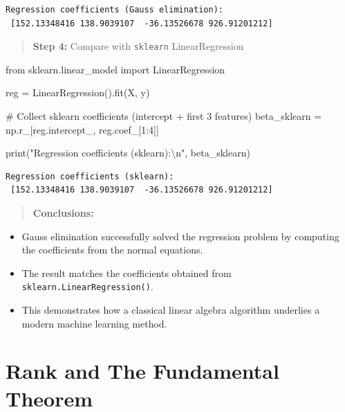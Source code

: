 \documentclass[
  letterpaper,
  DIV=11,
  numbers=noendperiod]{scrreprt}
\newenvironment{Shaded}{\begin{snugshade}}{\end{snugshade}}
\newcommand{\BuiltInTok}[1]{\textcolor[rgb]{0.00,0.23,0.31}{#1}}
\newcommand{\CharTok}[1]{\textcolor[rgb]{0.13,0.47,0.30}{#1}}
\newcommand{\CommentTok}[1]{\textcolor[rgb]{0.37,0.37,0.37}{#1}}
\newcommand{\DecValTok}[1]{\textcolor[rgb]{0.68,0.00,0.00}{#1}}
\newcommand{\ImportTok}[1]{\textcolor[rgb]{0.00,0.46,0.62}{#1}}
\newcommand{\NormalTok}[1]{\textcolor[rgb]{0.00,0.23,0.31}{#1}}
\newcommand{\OperatorTok}[1]{\textcolor[rgb]{0.37,0.37,0.37}{#1}}
\newcommand{\StringTok}[1]{\textcolor[rgb]{0.13,0.47,0.30}{#1}}
\begin{document}
\begin{verbatim}
Regression coefficients (Gauss elimination):
 [152.13348416 138.9039107  -36.13526678 926.91201212]
\end{verbatim}

\begin{quote}
\textbf{Step 4:} Compare with \texttt{sklearn} LinearRegression
\end{quote}

\begin{Shaded}
\begin{Highlighting}[]
\ImportTok{from}\NormalTok{ sklearn.linear\_model }\ImportTok{import}\NormalTok{ LinearRegression}

\NormalTok{reg }\OperatorTok{=}\NormalTok{ LinearRegression().fit(X, y)}

\CommentTok{\# Collect sklearn coefficients (intercept + first 3 features)}
\NormalTok{beta\_sklearn }\OperatorTok{=}\NormalTok{ np.r\_[reg.intercept\_, reg.coef\_[}\DecValTok{1}\NormalTok{:}\DecValTok{4}\NormalTok{]]}

\BuiltInTok{print}\NormalTok{(}\StringTok{"Regression coefficients (sklearn):}\CharTok{\textbackslash{}n}\StringTok{"}\NormalTok{, beta\_sklearn)}
\end{Highlighting}
\end{Shaded}

\begin{verbatim}
Regression coefficients (sklearn):
 [152.13348416 138.9039107  -36.13526678 926.91201212]
\end{verbatim}

\begin{quote}
\textbf{Conclusions:}
\end{quote}

\begin{itemize}
\item
  Gauss elimination successfully solved the regression problem by
  computing the coefficients from the normal equations.
\item
  The result matches the coefficients obtained from
  \texttt{sklearn.LinearRegression()}.
\item
  This demonstrates how a classical linear algebra algorithm underlies a
  modern machine learning method.
\end{itemize}

\section{Rank and The Fundamental
Theorem}\label{rank-and-the-fundamental-theorem}
\end{document}

